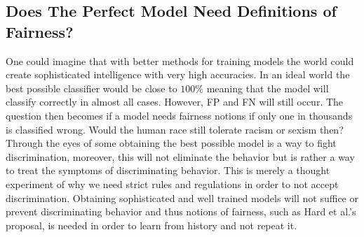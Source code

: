 \documentclass[11pt, fleqn, titlepage]{article}
\begin{document}
	\subsection{Does The Perfect Model Need Definitions of Fairness?}\label{perf_model}
	One could imagine that with better methods for training models the world could create sophisticated intelligence with very high accuracies. In an ideal world the best possible classifier would be close to $ 100 \% $ meaning that the model will classify correctly in almost all cases. However, FP and FN will still occur. The question then becomes if a model needs fairness notions if only one in thousands is classified wrong. Would the human race still tolerate racism or sexism then? Through the eyes of some obtaining the best possible model is a way to fight discrimination, moreover, this will not eliminate the behavior but is rather a way to treat the symptoms of discriminating behavior. This is merely a thought experiment of why we need strict rules and regulations in order to not accept discrimination. Obtaining sophisticated and well trained models will not suffice or prevent discriminating behavior and thus notions of fairness, such as Hard et al.'s proposal, is needed in order to learn from history and not repeat it.
	
\end{document}
